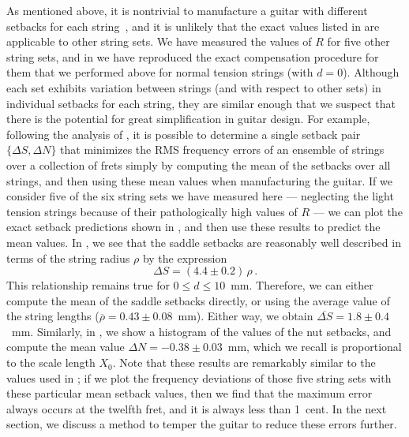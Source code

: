 As mentioned above, it is nontrivial to manufacture a guitar with different setbacks for each string~\cite{ref:byers1996cgi}, and it is unlikely that the exact values listed in  are applicable to other string sets. We have measured the values of $R$ for five other string sets, and in  we have reproduced the exact compensation procedure for them that we performed above for normal tension strings (with $d = 0$). Although each set exhibits variation between strings (and with respect to other sets) in individual setbacks for each string, they are similar enough that we suspect that there is the potential for great simplification in guitar design. For example, following the analysis of , it is possible to determine a single setback pair $\{\Delta S, \Delta N\}$ that minimizes the RMS frequency errors of an ensemble of strings over a collection of frets simply by computing the mean of the setbacks over all strings, and then using these mean values when manufacturing the guitar. If we consider five of the six string sets we have measured here --- neglecting the light tension strings because of their pathologically high values of $R$ --- we can plot the exact setback predictions shown in , and then use these results to predict the mean values. In , we see that the saddle setbacks are reasonably well described in terms of the string radius $\rho$ by the expression
\begin{equation}
  \Delta S = (4.4 \pm 0.2)\, \rho\, .
\end{equation}
This relationship remains true for $0 \le d \le 10$~mm. Therefore, we can either compute the mean of the saddle setbacks directly, or using the average value of the string lengths ($\overline{\rho} = 0.43 \pm 0.08$~mm). Either way, we obtain $\overline{\Delta S} = 1.8 \pm 0.4$~mm. Similarly, in , we show a histogram of the values of the nut setbacks, and compute the mean value $\Delta N = -0.38 \pm 0.03$~mm, which we recall is proportional to the scale length $X_0$. Note that these results are remarkably similar to the values used in ; if we plot the frequency deviations of those five string sets with these particular mean setback values, then we find that the maximum error always occurs at the twelfth fret, and it is always less than 1~cent. In the next section, we discuss a method to temper the guitar to reduce these errors further.

